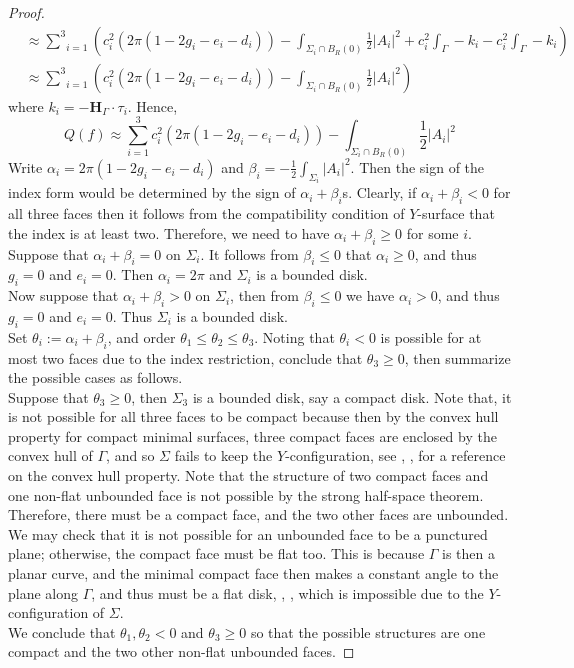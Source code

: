 \documentclass[10pt,a4paper]{amsart}
\theoremstyle{theorem}
\theoremstyle{definition}
\numberwithin{equation}{section}
\providecommand{\bold}{\mathbf}
\begin{document}
\begin{proof}
\begin{equation}
\begin{split}
&\approx \underset{i=1}{\overset{3}{\sum}}(c_i^2 (2\pi (1-2g_i-e_i-d_i))-\int_{\Sigma_i\cap B_R(0)} \frac{1}{2}\vert A_i\vert^2 +c_i^2\int_{\Gamma} -k_i -c_i^2\int_{\Gamma} -k_i )\\
&\approx \underset{i=1}{\overset{3}{\sum}}(c_i^2 (2\pi (1-2g_i-e_i-d_i))-\int_{\Sigma_i\cap B_R(0)} \frac{1}{2}\vert A_i\vert^2 )
\end{split}
\end{equation}
where $k_i=-\bold{H}_{\Gamma}\cdot \tau_i$. 
Hence,
\begin{equation}\label{eqn: Q(f), f=(c1,c2,c3)}
Q(f)\approx \underset{i=1}{\overset{3}{\sum}} c_i^2  (2\pi (1-2g_i-e_i-d_i))-\int_{\Sigma_i\cap B_R(0)}\frac{1}{2}\vert A_i\vert^2 
\end{equation}
Write $\alpha_i=2\pi(1-2g_i-e_i-d_i)$ and $\beta_i=-\frac{1}{2}\int_{\Sigma_i}\vert A_i\vert^2$. Then the sign of the index form would be determined by the sign of $\alpha_i+\beta_i$s. Clearly, if $\alpha_i+\beta_i<0$ for all three faces then it follows from the compatibility condition of $Y$-surface that the index is at least two. Therefore, we need to have $\alpha_i+\beta_i\geq 0$ for some $i$. \\
Suppose that $\alpha_i+\beta_i=0$ on $\Sigma_i$. It follows from $\beta_i \leq 0$ that $\alpha_i\geq 0$, and thus $g_i=0$ and $e_i=0$. Then $\alpha_i=2\pi$ and $\Sigma_i$ is a bounded disk.  \\
Now suppose that  $\alpha_i+\beta_i>0$ on $\Sigma_i$, then from $\beta_i\leq 0$ we have $\alpha_i >0$, and thus $g_i=0$ and $e_i=0$. Thus $\Sigma_i$ is a bounded disk.\\

Set $\theta_i:=\alpha_i+\beta_i$, and order $\theta_1 \leq \theta_2 \leq \theta_3$. Noting that $\theta_i<0$ is possible for at most two faces due to the index restriction, conclude that $\theta_3 \geq 0$, then summarize the possible cases as follows.\\
 Suppose that $\theta_3\geq0$, then $\Sigma_3$ is a bounded disk, say a compact disk. Note that, it is not possible for all three faces to be compact because then by the convex hull property for compact minimal surfaces, three compact faces are enclosed by the convex hull of $\Gamma$, and so $\Sigma$ fails to keep the $Y$-configuration, see \cite{colding2011course}, \cite{osserman1971convex}, for a reference on the convex hull property. Note that the structure of two compact faces and one non-flat unbounded face is not possible by the strong half-space theorem. Therefore, there must be a compact face, and the two other faces are unbounded. We may check that it is not possible for an unbounded face to be a punctured plane; otherwise, the compact face must be flat too. This is because $\Gamma$ is then a planar curve, and the minimal compact face then makes a constant angle to the plane along $\Gamma$, and thus must be a flat disk, \cite{nitsche1989lectures}, \cite{nitsche1965new}, which is impossible due to the $Y$-configuration of $\Sigma$. \\
We conclude that $\theta_1, \theta_2<0$ and $\theta_3\geq0$ so that the possible structures are one compact and the two other non-flat unbounded faces. 
\medskip


\end{proof}
\end{document}
